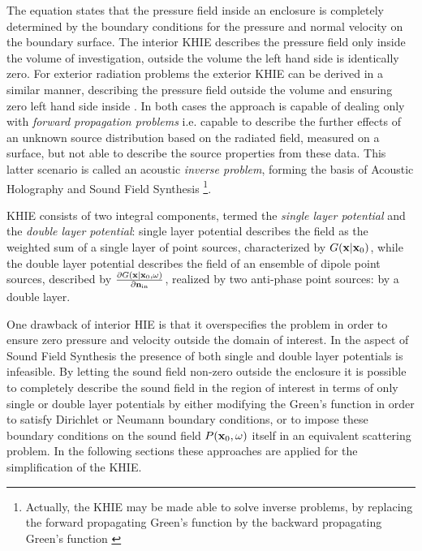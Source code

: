 The equation states that the pressure field inside an enclosure is completely determined by the boundary conditions for the pressure and normal velocity on the boundary surface.
The interior KHIE describes the pressure field only inside the volume of investigation, outside the volume the left hand side is identically zero. For exterior radiation problems the exterior KHIE can be derived in a similar manner, describing the pressure field outside the volume and ensuring zero left hand side inside \cite{Williams1999}.
In both cases the approach is capable of dealing only with \emph{forward propagation problems} i.e. capable to describe the further effects of an unknown source distribution based on the radiated field, measured on a surface, but not able to describe the source properties from these data. 
This latter scenario is called an acoustic \emph{inverse problem}, forming the basis of Acoustic Holography and Sound Field Synthesis 
\footnote{Actually, the KHIE may be made able to solve inverse problems, by replacing the forward propagating Green's function by the backward propagating Green's function \cite{Wapenaar1989}}.
\vspace{3mm}

KHIE consists of two integral components, termed the \emph{single layer potential} and the \emph{double layer potential}: single layer potential describes the field as the weighted sum of a single layer of point sources, characterized by $ G(\mathbf{x}|\mathbf{x}_0) $, while the double layer potential describes the field of an ensemble of dipole point sources, described by $\frac{\partial G(\mathbf{x}|\mathbf{x}_0,\omega)}{\partial \mathbf{n}_{\mathrm{in}}}$, realized by two anti-phase point sources: by a double layer.

One drawback of interior HIE is that it overspecifies the problem in order to ensure zero pressure and velocity outside the domain of interest. 
In the aspect of Sound Field Synthesis the presence of both single and double layer potentials is infeasible.
By letting the sound field non-zero outside the enclosure it is possible to completely describe the sound field in the region of interest in terms of only single or double layer potentials by either modifying the Green's function in order to satisfy Dirichlet or Neumann boundary conditions, or to impose these boundary conditions on the sound field $ P(\mathbf{x}_0,\omega)$ itself in an equivalent scattering problem.
In the following sections these approaches are applied for the simplification of the KHIE.



